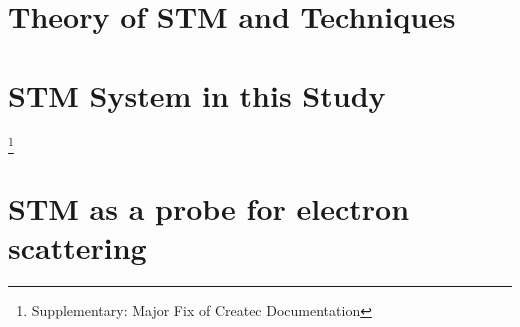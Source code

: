 \section{Theory of STM and Techniques}
\section{STM System in this Study}
\footnote{Supplementary: Major Fix of Createc Documentation}
\section{STM as a probe for electron scattering}
